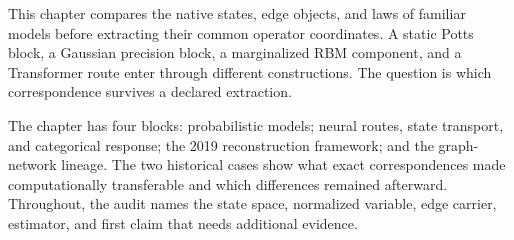 This chapter compares the native states, edge objects, and laws of familiar models before
extracting their common operator coordinates.  A static Potts block, a Gaussian precision block,
a marginalized RBM component, and a Transformer route enter through different constructions.
The question is which correspondence survives a declared extraction.

The chapter has four blocks: probabilistic models; neural routes, state transport, and categorical
response; the 2019 reconstruction framework; and the graph-network lineage.  The two historical
cases show what exact correspondences made computationally transferable and which differences
remained afterward.  Throughout, the audit names the state space, normalized variable, edge
carrier, estimator, and first claim that needs additional evidence.
